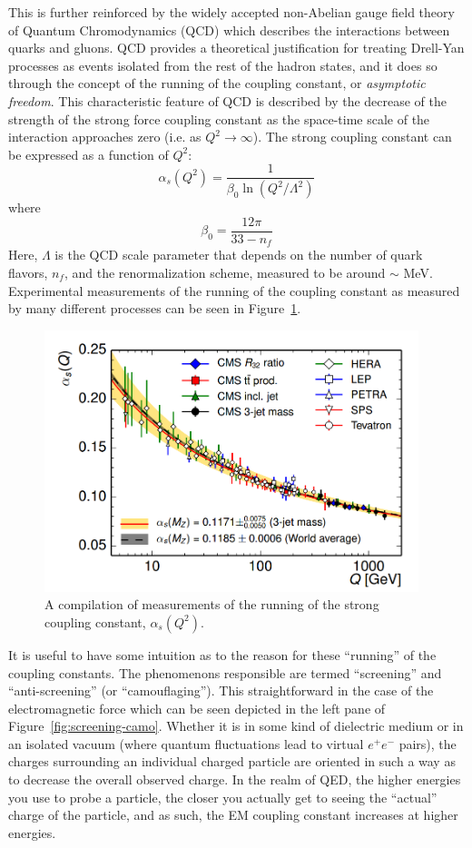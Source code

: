 This is further reinforced by the widely accepted non-Abelian gauge field theory of Quantum Chromodynamics (QCD) which describes the interactions between quarks and gluons. QCD provides a theoretical justification for treating Drell-Yan processes as events isolated from the rest of the hadron states, and it does so through the concept of the running of the coupling constant, or \emph{asymptotic freedom}\cite{Bethke:2006ac}. This characteristic feature of QCD is described by the decrease of the strength of the strong force coupling constant as the space-time scale of the interaction approaches zero (i.e. as $Q^2 \rightarrow \infty$). The strong coupling constant can be expressed as a function of $Q^2$:
\begin{equation}
\alpha_s(Q^2) = \frac{1}{\beta_0 \ln (Q^2/\Lambda^2)}
\end{equation}
where
\begin{equation}
\beta_0 = \frac{12\pi}{33-n_f}
\end{equation}
Here, $\Lambda$ is the QCD scale parameter that depends on the number of quark flavors, $n_f$, and the renormalization scheme, measured to be around $\sim$ \unit[217]{MeV}. Experimental measurements of the running of the coupling constant as measured by many different processes can be seen in Figure~\ref{fig:asymptotic-freedom}.
\begin{figure}
	\centering
	\includegraphics[height=3in]{figures/background/running-strong-coupling.png}
	\caption{A compilation of measurements of the running of the strong coupling constant, $\alpha_s(Q^2)$\cite{CMS:2014mna}.}
	\label{fig:asymptotic-freedom}
\end{figure}

It is useful to have some intuition as to the reason for these ``running'' of the coupling constants. The phenomenons responsible are termed ``screening'' and ``anti-screening'' (or ``camouflaging'')\cite{Quigg:1985ai}. This straightforward in the case of the electromagnetic force which can be seen depicted in the left pane of Figure~\ref{fig:screening-camo}. Whether it is in some kind of dielectric medium or in an isolated vacuum (where quantum fluctuations lead to virtual $e^+e^-$ pairs), the charges surrounding an individual charged particle are oriented in such a way as to decrease the overall observed charge. In the realm of QED, the higher energies you use to probe a particle, the closer you actually get to seeing the ``actual'' charge of the particle, and as such, the EM coupling constant increases at higher energies.

